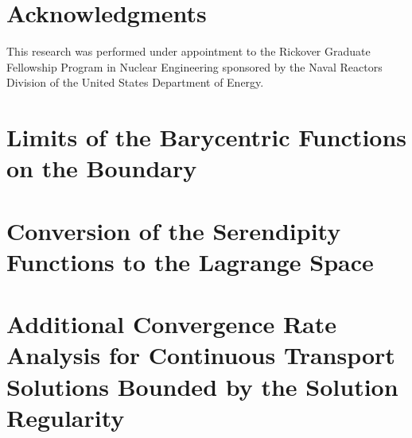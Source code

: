 \documentclass[preprint,10pt]{elsarticle}
\begin{document}
\section*{Acknowledgments} 
This research was performed under appointment to the Rickover Graduate Fellowship Program in Nuclear Engineering sponsored by the Naval Reactors Division of the United States Department of Energy.





\appendix
\section{Limits of the Barycentric Functions on the Boundary}  \label{app::bound}

\section{Conversion of the Serendipity Functions to the Lagrange Space}  \label{app::Lagrange}

\iffalse
\section{Additional Convergence Rate Analysis for Continuous Transport Solutions Bounded by the Solution Regularity}  \label{app::Lagrange}
\end{document}
